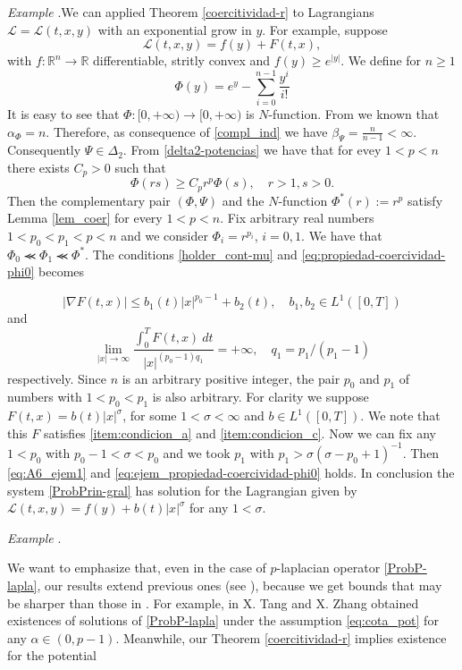 \documentclass[twoside]{article}
\theoremstyle{remark}
\newcommand{\rr}{\mathbb{R}}
\renewcommand{\leq}{\leqslant}
\renewcommand{\geq}{\geqslant}
\newcounter{example}
\newenvironment{example}{\noindent\textit{Example} \arabic{example}.}{\addtocounter{example}{1}}
\begin{document}
\begin{example}We can applied Theorem \ref{coercitividad-r} to Lagrangians $\mathcal{L}=\mathcal{L}(t,x,y)$ with an exponential grow in $y$. For example, suppose
  \[\mathcal{L}(t,x,y)=f(y)+F(t,x),\]
with $f:\rr^n\to\rr$ differentiable, stritly convex and $f(y)\geq e^{|y|}$. We define for $n\geq 1$
\[\Phi(y)=e^y-\sum\limits_{i=0}^{n-1}\frac{y^i}{i!}  \]
It is easy to see that $\Phi:[0,+\infty)\to [0,+\infty)$  is $N$-function. From \cite[Ex. 3, p. 85]{M} we known that $\alpha_{\Phi}=n$. Therefore, as consequence of \eqref{compl_ind} we have $\beta_{\Psi}=\frac{n}{n-1}<\infty$. Consequently $\Psi\in\Delta_2$. From \eqref{delta2-potencias} we have that for evey $1<p<n$ there exists $C_p>0$ such that
\[\Phi(rs)\geq C_pr^p\Phi(s),\quad r>1,s>0.\]
Then the complementary pair $(\Phi,\Psi)$ and the $N$-function $\Phi^*(r):=r^p$ satisfy Lemma \ref{lem_coer} for every $1<p<n$. Fix arbitrary real numbers $1<p_0<p_1<p<n$ and we consider $\Phi_i=r^{p_i}$, $i=0,1$. We have that $\Phi_0\llcurly \Phi_1\llcurly \Phi^*$.
The conditions  \eqref{holder_cont-mu} and     \eqref{eq:propiedad-coercividad-phi0} becomes

\begin{equation}\label{eq:A6_ejem1}
  \left| \nabla F(t,x) \right|\leq b_1(t)|x|^{p_0-1}+b_2(t), \quad b_1,b_2\in L^1([0,T])
\end{equation}
and
\begin{equation}\label{eq:ejem_propiedad-coercividad-phi0}
\lim_{|x|\to\infty}\frac{\int_{0}^{T}F(t,x)\ dt}{|x|^{(p_0-1)q_1 }}=+\infty,\quad q_1=p_1/(p_1-1)
\end{equation}
respectively. Since $n$ is an arbitrary positive integer, the pair $p_0$ and $p_1$ of numbers with $1<p_0<p_1$ is also arbitrary. For clarity we suppose $F(t,x)=b(t)|x|^{\sigma}$, for some $1<\sigma<\infty$ and $b\in L^1([0,T])$. We note that this $F$ satisfies \eqref{item:condicion_a} and \eqref{item:condicion_c}. Now we can fix any $1<p_0$ with $p_0-1<\sigma<p_0$ and we took $p_1$ with $p_1>\sigma(\sigma-p_0+1)^{-1}$. Then \eqref{eq:A6_ejem1}
 and \eqref {eq:ejem_propiedad-coercividad-phi0} holds. In conclusion the system \eqref{ProbPrin-gral} has solution for the Lagrangian given by $\mathcal{L}(t,x,y)=f(y)+b(t)|x|^{\sigma}$ for any $1<\sigma$.
\end{example}






\begin{example}\end{example}
We want to emphasize that, even in the case of $p$-laplacian operator \eqref{ProbP-lapla}, our results  extend  previous ones (see \cite{tang1998periodic, tang2010periodic}), because
 we get bounds that may be  sharper than those in \cite{tang1998periodic,tang2010periodic}. 
For example, in  \cite[Th. 2.1]{tang2010periodic} X. Tang and X. Zhang obtained existences of solutions of \eqref{ProbP-lapla}
under the assumption \eqref{eq:cota_pot}
 for any $\alpha\in (0,p-1)$. Meanwhile, our Theorem \ref{coercitividad-r} implies existence for the potential
\end{document}
